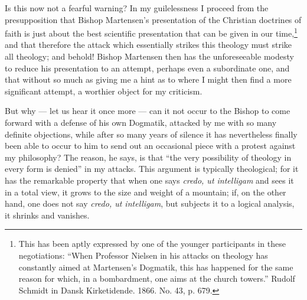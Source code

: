 \documentclass[12pt]{book}
\newcommand{\opage}[1]{\marginnote{\footnotesize\textit{[#1]}}}
\begin{document}
Is this now not a fearful warning? In my guilelessness I proceed from the presupposition that Bishop Martensen's presentation of the Christian doctrines of faith is just about the best scientific presentation that can be given in our time,\footnote{This has been aptly expressed by one of the younger participants in these negotiations: ``When Professor Nielsen in his attacks on theology has constantly aimed at Martensen's Dogmatik, this has happened for the same reason for which, in a bombardment, one aims at the church towers.'' Rudolf Schmidt in Dansk Kirketidende. 1866. No. 43, p. 679.} and that therefore the attack which essentially strikes this theology must strike all theology; and behold! Bishop Martensen then has the unforeseeable modesty to reduce his presentation to an attempt, perhaps even a subordinate one, and that without so much as giving me a hint as to where I might then find a more significant attempt, a worthier object for my criticism.

\opage{78}\setcounter{footnote}{0}%
But why --- let us hear it once more --- can it not occur to the Bishop to come forward with a defense of his own Dogmatik, attacked by me with so many definite objections, while after so many years of silence it has nevertheless finally been able to occur to him to send out an occasional piece with a protest against my philosophy? The reason, he says, is that ``the very possibility of theology in every form is denied'' in my attacks. This argument is typically theological; for it has the remarkable property that when one says \textit{credo, ut intelligam} and sees it in a total view, it grows to the size and weight of a mountain; if, on the other hand, one does not say \textit{credo, ut intelligam}, but subjects it to a logical analysis, it shrinks and vanishes.
\end{document}
